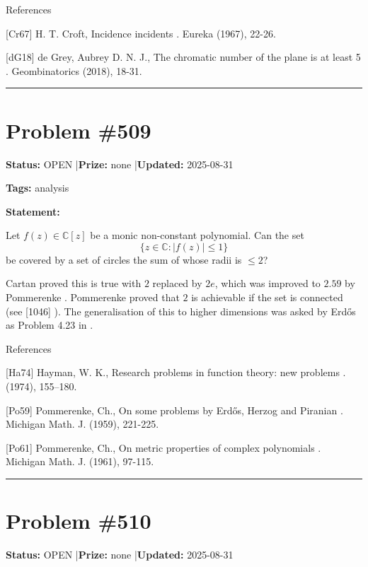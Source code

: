 \documentclass{article}
\begin{document}
References

[Cr67] H. T. Croft, Incidence incidents . Eureka (1967), 22-26.

[dG18] de Grey, Aubrey D. N. J., The chromatic number of the plane is at least 5 . Geombinatorics (2018), 18-31.

\noindent\rule{\linewidth}{0.4pt}


\section{Problem \#509}
\label{prob:509}

\noindent\textbf{Status:} OPEN \quad|\quad \textbf{Prize:} none \quad|\quad \textbf{Updated:} 2025-08-31

\noindent\textbf{Tags:} analysis

\medskip

\noindent\textbf{Statement:}

Let $f(z)\in\mathbb{C}[z]$ be a monic non-constant polynomial. Can the set\[\{ z\in \mathbb{C} : \lvert f(z)\rvert \leq 1\}\]be covered by a set of circles the sum of whose radii is $\leq 2$?




Cartan proved this is true with $2$ replaced by $2e$, which was improved to $2.59$ by Pommerenke \cite{Po61}. Pommerenke \cite{Po59} proved that $2$ is achievable if the set is connected (see [1046] ). The generalisation of this to higher dimensions was asked by Erd\H{o}s as Problem 4.23 in \cite{Ha74}.




References

[Ha74] Hayman, W. K., Research problems in function theory: new problems . (1974), 155--180.

[Po59] Pommerenke, Ch., On some problems by Erd\H{o}s, Herzog and Piranian . Michigan Math. J. (1959), 221-225.

[Po61] Pommerenke, Ch., On metric properties of complex polynomials . Michigan Math. J. (1961), 97-115.

\noindent\rule{\linewidth}{0.4pt}


\section{Problem \#510}
\label{prob:510}

\noindent\textbf{Status:} OPEN \quad|\quad \textbf{Prize:} none \quad|\quad \textbf{Updated:} 2025-08-31
\end{document}
